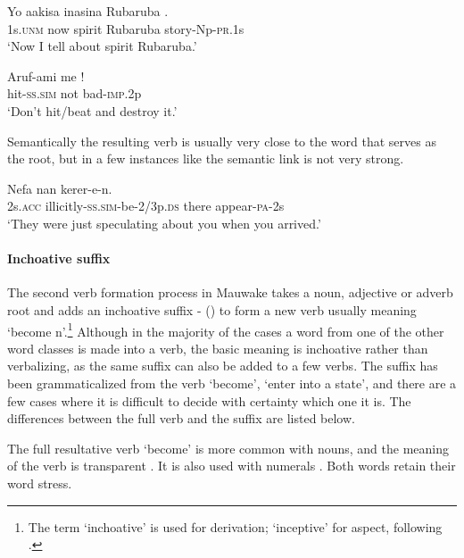 \ea%
\label{ex:3:x188}
\gll Yo aakisa inasina Rubaruba .\\
1s.\textsc{unm} now spirit Rubaruba story-Np-\textsc{pr}.1s \\
\glt`Now I tell about spirit Rubaruba.'
\z

\ea%
\label{ex:3:x189}
\gll Aruf-ami me !\\
hit-\textsc{ss}.\textsc{sim} not bad-\textsc{imp}.2p \\
\glt`Don't hit/beat and destroy it.' 
\z

Semantically the resulting verb is usually very close to the word that serves as the root, but in a few instances like  the semantic link is not very strong.

\ea%
\label{ex:3:x190}
\gll Nefa  nan kerer-e-n. \\
2s.\textsc{acc} illicitly-\textsc{ss}.\textsc{sim}-be-2/3p.\textsc{ds} there appear-\textsc{pa}-2s \\
\glt`They were just speculating about you when you arrived.' 
\z

\paragraph{Inchoative suffix} \label{sec:3.8.2.2.2}
{}
The second verb formation process in Mauwake takes a noun, adjective or adverb root and adds an inchoative suffix - () to form a new verb usually meaning `become n'.\footnote{The term `inchoative' is used for derivation; `inceptive' for aspect, following \citet[95]{Payne1997}.} Although in the majority of the cases a word from one of the other word classes is made into a verb, the basic meaning is inchoative rather than verbalizing, as the same suffix can also be added to a few verbs. The suffix has been grammaticalized from the verb \textstyleEmphasizedVernacularWords{-} `become', `enter into a state', and there are a few cases where it is difficult to decide with certainty which one it is. The differences between the full verb and the suffix are listed below. 

The full resultative verb \textstyleEmphasizedVernacularWords{-} `become' is more common with nouns, and the meaning of the verb is transparent . It is also used with numerals . Both words retain their word stress.

